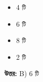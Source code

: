 \documentclass[12pt, a4paper]{article}
\begin{document}
\begin{itemize}[label={}, leftmargin=1cm, itemsep=0.5em]
    \item[\textbf{A)}] 4 টি
    \item[\textbf{B)}] 6 টি
    \item[\textbf{C)}] 8 টি
    \item[\textbf{D)}] 2 টি
\end{itemize}

\vspace{0.5em}
\begin{tcolorbox}[answerbox]
    \textbf{\color{success} উত্তর:} B) 6 টি
\end{tcolorbox}
\vspace{1em}
\end{document}

